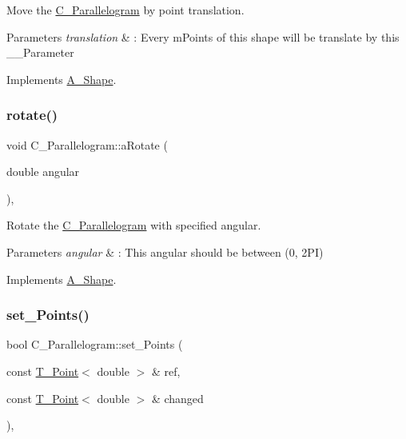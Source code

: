 Move the \hyperlink{classParallelogram}{C_Parallelogram} by point translation.


\begin{DoxyParams}{Parameters}
{\em translation} & \+: Every mPoints of this shape will be translate by this __Parameter \\
\hline
\end{DoxyParams}


Implements \hyperlink{classShape_a1f447acd6219cb10b9b7a40371519c46}{A_Shape}.

\mbox{\label{classParallelogram_ac498f6a15dea236ecc49bece023d17b0}} 
\subsubsection{\texorpdfstring{rotate()}{Rotate()}}
{\footnotesize\ttfamily void C_Parallelogram\+::aRotate (\begin{DoxyParamCaption}\item[{double}]{angular }\end{DoxyParamCaption})\hspace{0.3cm}{\ttfamily [override]}, {\ttfamily [virtual]}}



Rotate the \hyperlink{classParallelogram}{C_Parallelogram} with specified angular.


\begin{DoxyParams}{Parameters}
{\em angular} & \+: This angular should be between (0, 2\+PI) \\
\hline
\end{DoxyParams}


Implements \hyperlink{classShape_a2dea8616fd40f2d69fd208715921982a}{A_Shape}.

\mbox{\label{classParallelogram_ab74583703a60e4b798d7048aa684f44e}} 
\subsubsection{\texorpdfstring{set\+\_\+\+Points()}{set\_Points()}}
{\footnotesize\ttfamily bool C_Parallelogram\+::set\+\_\+\+Points (\begin{DoxyParamCaption}\item[{const \hyperlink{classPoint}{T_Point}$<$ double $>$ \&}]{ref,  }\item[{const \hyperlink{classPoint}{T_Point}$<$ double $>$ \&}]{changed }\end{DoxyParamCaption})\hspace{0.3cm}{\ttfamily [override]}, {\ttfamily [virtual]}}



